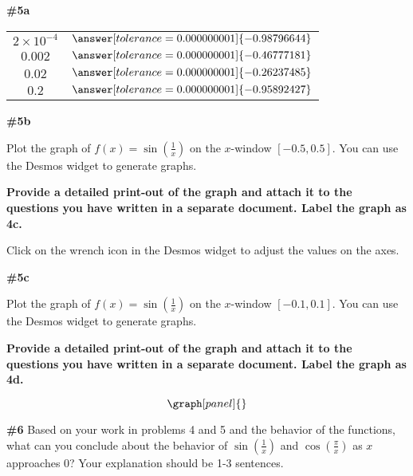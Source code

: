 \documentclass[handout,nooutcomes]{ximera}
\begin{document}
\begin{problem}
\begin{problem}{\textbf{\#5a}}
\begin{tabular}{|c|c|}
		$2\times10^{-4}$ & $\answer[tolerance=0.000000001]{-0.98796644}$ \\
		
		$0.002$ & $\answer[tolerance=0.000000001]{-0.46777181}$ \\
		
		$0.02$ & $\answer[tolerance=0.000000001]{-0.26237485}$ \\
		
		$0.2$ & $\answer[tolerance=0.000000001]{-0.95892427}$ \\
		
\end{tabular}
\end{problem}



\begin{problem}{\textbf{\#5b}}

Plot the graph of $f(x)=\sin\left(\frac{1}{x}\right)$ on the $x$-window $[-0.5,0.5]$. You can use the Desmos widget to generate graphs. 

\textbf{Provide a detailed print-out of the graph and attach it to the questions you have written in a separate document. Label the graph as 4c.}

\begin{hint}
Click on the wrench icon in the Desmos widget to adjust the values on the axes.
\end{hint}


\end{problem}

\begin{problem}{\textbf{\#5c}}

Plot the graph of $f(x)=\sin\left(\frac{1}{x}\right)$ on the $x$-window $[-0.1,0.1]$. You can use the Desmos widget to generate graphs. 

\textbf{Provide a detailed print-out of the graph and attach it to the questions you have written in a separate document. Label the graph as 4d.}

\end{problem}

\[
\graph[panel]{}
\]

\end{problem}



\begin{problem}{\textbf{\#6}}
Based on your work in problems 4 and 5 and the behavior of the functions, what can you conclude about the behavior of $\sin\left(\frac{1}{x}\right)$ and $\cos\left(\frac{\pi}{x}\right)$ as $x$ approaches 0? Your explanation should be 1-3 sentences.

\end{problem}
\end{document}
